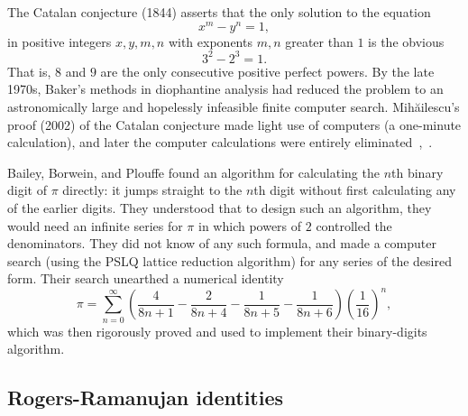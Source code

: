 \documentclass{llncs}
\begin{document}

\smallskip

The Catalan conjecture (1844) asserts that the only solution to the equation
\[
x^m - y^n = 1,
\]
in positive integers $x,y,m,n$ with exponents $m,n$ greater than $1$
is the obvious
\[
3^2 - 2^3 = 1.
\]
That is, $8$ and $9$ are the only consecutive positive perfect powers.
By the late 1970s, Baker's methods in diophantine analysis had reduced
the problem to an astronomically large and hopelessly infeasible finite
computer search.  Mih\u ailescu's proof (2002) of the Catalan
conjecture made light use of computers (a one-minute calculation), and
later the computer calculations were entirely eliminated~\cite{Mih},~\cite{TM03}.

\smallskip


Bailey, Borwein, and Plouffe found an algorithm for calculating the
$n$th binary digit of $\pi$ directly: it jumps straight to the $n$th
digit without first calculating any of the earlier digits.  They
understood that to design such an algorithm, they would need an
infinite series for $\pi$ in which powers of $2$ controlled the
denominators.  They did not know of any such formula, and made a
computer search (using the PSLQ lattice reduction algorithm) for any
series of the desired form.  Their search unearthed a numerical
identity
\[
\pi = \sum_{n=0}^\infty 
\left(
\frac{4}{8n+1} - \frac{2}{8n+4} - \frac{1}{8n+5} - \frac{1}{8n+6}
\right) 
\left(\frac{1}{16}\right)^n,
\]
which was then rigorously proved and used to implement their
binary-digits algorithm.





\subsection{Rogers-Ramanujan identities}
\end{document}

